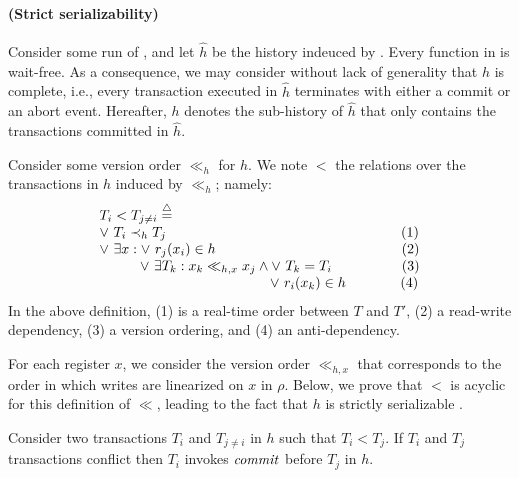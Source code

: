 \paragraph{(Strict serializability)}
Consider some run \run of , and let $\hat{h}$ be the history indeuced by \run.
Every function in  is wait-free.
As a consequence, we may consider without lack of generality that $\hat{h}$ is complete, i.e., every transaction executed in $\hat{h}$ terminates with either a commit or an abort event.
Hereafter, $h$ denotes the sub-history of $\hat{h}$ that only contains the transactions committed in $\hat{h}$.

Consider some version order $\ll_h$ for $h$.
We note $<$ the relations over the transactions in $h$ induced by $\ll_h$; namely:
\begin{displaymath}
  \begin{array}{l}
    T_i < T_{j \neq i}  \equaldef \\
    \lor~ T_i \hb_h T_j {\hspace{16.8em}\text{(1)}} \\
    \lor~ \exists x : \lor~ r_j(x_i) \in h {\hspace{13.3em}\text{(2)}} \\
    \hspace{2.9em}\lor~ \exists T_k : x_k \ll_{h,x} x_j \land \lor~T_k = T_i {\hspace{5em}\text{(3)}} \\
    \hspace{12.2em} \lor~ r_i(x_k) \in h {\hspace{3.9em}\text{(4)}}
  \end{array}
\end{displaymath}
In the above definition, (1) is a real-time order between $T$ and $T'$, (2) a read-write dependency, (3) a version ordering, and (4) an anti-dependency.

For each register $x$, we consider the version order $\ll_{h,x}$ that corresponds to the order in which writes are linearized on $x$ in $\rho$.
Below, we prove that $<$ is acyclic for this definition of $\ll$, leading to the fact that $h$ is strictly serializable \cite{adyaPHD,pap79}.

\begin{proposition}
  Consider two transactions $T_i$ and $T_{j \neq i}$ in $h$ such that $T_i < T_j$.
  If $T_i$ and $T_j$ transactions conflict then $T_i$ invokes $\stmCommitFunction$ before $T_j$ in $h$.
\end{proposition}

